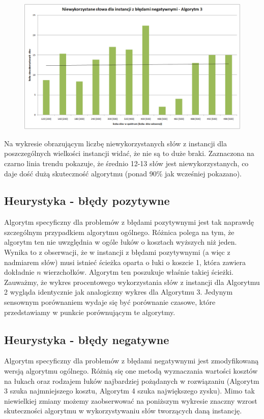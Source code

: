 \documentclass[a4paper,10pt]{article}
\begin{document}
\begin{figure}[h]
  \footnotesize\centering
  \includegraphics[width=\textwidth,keepaspectratio]{unusedWords_general_negative.png}
\end{figure}

Na wykresie obrazującym liczbę niewykorzystanych słów z instancji dla poszczególnych wielkości instancji widać, że nie są to duże braki. 
Zaznaczona na czarno linia trendu pokazuje, że średnio 12-13 słów jest niewykorzystanych, co daje dość dużą skuteczność algorytmu (ponad 90\% jak wcześniej pokazano).

\subsection{Heurystyka - błędy pozytywne}

Algorytm specyficzny dla problemów z błędami pozytywnymi jest tak naprawdę szczególnym przypadkiem algorytmu ogólnego.
Różnica polega na tym, że algorytm ten nie uwzględnia w ogóle łuków o kosztach wyższych niż jeden. Wynika to z obserwacji, 
że w instancji z błędami pozytywnymi (a więc z nadmiarem słów) musi istnieć ścieżka oparta o łuki o koszcie 1, która 
zawiera dokładnie $n$ wierzchołków. Algorytm ten poszukuje właśnie takiej ścieżki. Zauważmy, że wykres procentowego 
wykorzystania słów z instancji dla Algorytmu 2 wygląda identycznie jak analogiczny wykres dla Algorytmu 3. Jedynym 
sensownym porównaniem wydaje się być porównanie czasowe, które przedstawiamy w punkcie porównującym te algorytmy.

\subsection{Heurystyka - błędy negatywne}

Algorytm specyficzny dla problemów z błędami negatywnymi jest zmodyfikowaną wersją algorytmu ogólnego. Różnią się one
metodą wyznaczania wartości kosztów na łukach oraz rodzajem łuków najbardziej pożądanych w rozwiązaniu (Algorytm 3 szuka 
najmniejszego kosztu, Algorytm 4 szuka największego zysku). Mimo tak niewielkiej zmiany możemy zaobserwować na poniższym 
wykresie znaczny wzrost skuteczności algorytmu w wykorzystywaniu słów tworzących daną instancję.
\end{document}
